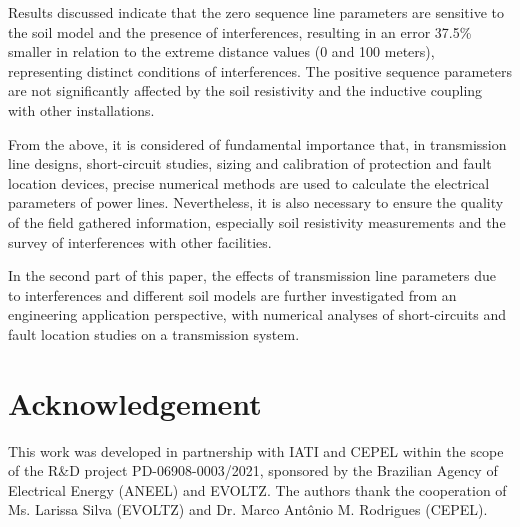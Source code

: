 \documentclass[conference]{IEEEtran}
\begin{document}
	Results discussed indicate that the zero sequence line parameters are sensitive to the soil model and the presence of interferences, resulting in an error 37.5\% smaller in relation to the extreme distance values (0 and 100 meters), representing distinct conditions of interferences. The positive sequence parameters are not significantly affected by the soil resistivity and the inductive coupling with other installations.
	
	From the above, it is considered of fundamental importance that, in transmission line designs, short-circuit studies, sizing and calibration of protection and fault location devices, precise numerical methods are used to calculate the electrical parameters of power lines. Nevertheless, it is also necessary to ensure the quality of the field gathered information, especially soil resistivity measurements and the survey of interferences with other facilities. 
	
	In the second part of this paper, the effects of transmission line parameters due to interferences and different soil models are further investigated from an engineering application perspective, with numerical analyses 
	of short-circuits and fault location studies on a transmission system.  

	\section*{Acknowledgement}
This work was developed  in partnership with IATI and CEPEL within the scope of the R\&D project PD-06908-0003/2021, sponsored by the Brazilian Agency of Electrical Energy (ANEEL) and EVOLTZ. The authors thank the cooperation of Ms. Larissa Silva (EVOLTZ) and Dr. Marco Antônio M. Rodrigues (CEPEL).
	
	
	
	\nocite{*}
	
	
	
\end{document}
